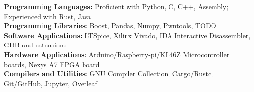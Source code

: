 \textbf{Programming Languages:} Proficient with Python, C, C++, Assembly; Experienced with Rust, Java\\
\textbf{Programming Libraries:} Boost, Pandas, Numpy, Pwntools, TODO\\
\textbf{Software Applications:} LTSpice, Xilinx Vivado, IDA Interactive Disassembler, GDB and extensions\\
\textbf{Hardware Applications:} Arduino/Raspberry-pi/KL46Z Microcontroller boards, Nexys A7 FPGA board\\
\textbf{Compilers and Utilities:} GNU Compiler Collection, Cargo/Rustc, Git/GitHub, Jupyter, Overleaf
